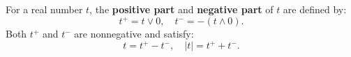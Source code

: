 For a real number $t$, the \textbf{positive part} and \textbf{negative part} of $t$ are defined by:
$$t^+ = t \vee 0, \quad t^- = -(t \wedge 0).$$
Both $t^+$ and $t^-$ are nonnegative and satisfy:
$$t = t^+ - t^-, \quad |t| = t^+ + t^-.$$
